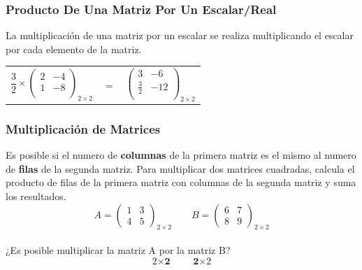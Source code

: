\documentclass[stu, 12pt, letterpaper, donotrepeattitle, floatsintext, natbib]{apa7}
\begin{document}
\newpage

\subsubsection{Producto De Una Matriz Por Un Escalar/Real}
La multiplicación de una matriz por un escalar se realiza multiplicando el escalar por cada elemento de la matriz.

\begin{table}[H]
\centering
\begin{tabular}{ccc}
$
\dfrac{3}{2} \times \begin{pmatrix}
2 & -4\\
1 & -8\\
\end{pmatrix}_{2\times2}
$  & $=$ & $
\begin{pmatrix}
3 & -6 \\
\frac{3}{2} & -12\\
\end{pmatrix}_{2\times2}
$\\ 

\end{tabular}
\end{table}


\subsubsection{Multiplicación de Matrices}
Es posible si el numero de \textbf{columnas} de la primera matriz es el mismo al numero de \textbf{filas} de la segunda matriz.
Para multiplicar dos matrices cuadradas, calcula el producto de filas de la primera matriz con columnas de la segunda matriz y suma los resultados.
$$
A=\begin{pmatrix}
1 & 3 \\ 4 & 5
\end{pmatrix}_{2\times2}
\qquad
B=\begin{pmatrix}
6 & 7 \\ 8 & 9
\end{pmatrix}_{2\times2}
$$\\

¿Es posible multiplicar la matriz A por la matriz B?
$${\textit{2}\times\textbf{2}} \qquad {\textbf{2}\times\textit{2}}$$\\
\end{document}
